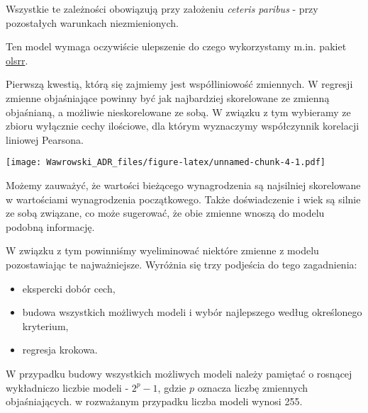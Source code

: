 \documentclass[]{book}
\newenvironment{Shaded}{\begin{snugshade}}{\end{snugshade}}
\newcommand{\KeywordTok}[1]{\textcolor[rgb]{0.13,0.29,0.53}{\textbf{#1}}}
\newcommand{\DataTypeTok}[1]{\textcolor[rgb]{0.13,0.29,0.53}{#1}}
\newcommand{\StringTok}[1]{\textcolor[rgb]{0.31,0.60,0.02}{#1}}
\newcommand{\OperatorTok}[1]{\textcolor[rgb]{0.81,0.36,0.00}{\textbf{#1}}}
\newcommand{\NormalTok}[1]{#1}
\providecommand{\tightlist}{%
  \setlength{\itemsep}{0pt}\setlength{\parskip}{0pt}}
\begin{document}
Wszystkie te zależności obowiązują przy założeniu \emph{ceteris paribus}
- przy pozostałych warunkach niezmienionych.

Ten model wymaga oczywiście ulepszenie do czego wykorzystamy m.in.
pakiet
\href{https://cran.r-project.org/web/packages/olsrr/index.html}{olsrr}.

Pierwszą kwestią, którą się zajmiemy jest współliniowość zmiennych. W
regresji zmienne objaśniające powinny być jak najbardziej skorelowane ze
zmienną objaśnianą, a możliwie nieskorelowane ze sobą. W związku z tym
wybieramy ze zbioru wyłącznie cechy ilościowe, dla którym wyznaczymy
współczynnik korelacji liniowej Pearsona.

\begin{Shaded}
\end{Shaded}

\texttt{[image: Wawrowski\_ADR\_files/figure-latex/unnamed-chunk-4-1.pdf]}

Możemy zauważyć, że wartości bieżącego wynagrodzenia są najsilniej
skorelowane w wartościami wynagrodzenia początkowego. Także
doświadczenie i wiek są silnie ze sobą związane, co może sugerować, że
obie zmienne wnoszą do modelu podobną informację.

W związku z tym powinniśmy wyeliminować niektóre zmienne z modelu
pozostawiając te najważniejsze. Wyróżnia się trzy podjeścia do tego
zagadnienia:

\begin{itemize}
\tightlist
\item
  ekspercki dobór cech,
\item
  budowa wszystkich możliwych modeli i wybór najlepszego według
  określonego kryterium,
\item
  regresja krokowa.
\end{itemize}

W przypadku budowy wszystkich możliwych modeli należy pamiętać o
rosnącej wykładniczo liczbie modeli - \(2^p-1\), gdzie \(p\) oznacza
liczbę zmiennych objaśniających. w rozważanym przypadku liczba modeli
wynosi 255.
\end{document}

